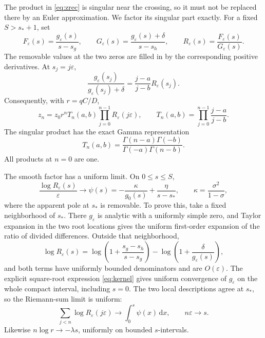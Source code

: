 \documentclass[11pt]{article}
\theoremstyle{definition}
\theoremstyle{remark}
\newcommand{\eps}{\varepsilon}
\newcommand{\dd}{\mathrm d}
\begin{document}
The product in \eqref{eq:zrec} is singular near the crossing, so it must not
be replaced there by an Euler approximation.  We factor its singular part
exactly.  For a fixed \(S>s_*+1\), set
\[
 F_\eps(s)=\frac{g_\eps(s)}{s-s_g},\qquad
 G_\eps(s)=\frac{g_\eps(s)+\delta}{s-s_h},\qquad
 R_\eps(s)=\frac{F_\eps(s)}{G_\eps(s)}.
\]
The removable values at the two zeros are filled in by the corresponding
positive derivatives.  At \(s_j=j\eps\),
\[
 \frac{g_\eps(s_j)}{g_\eps(s_j)+\delta}
 =
 \frac{j-a}{j-b}R_\eps(s_j).
\]
Consequently, with \(r=qC/D\),
\begin{equation}\label{eq:gamma-factor}
 z_n=z_0r^nT_n(a,b)
      \prod_{j=0}^{n-1}R_\eps(j\eps),
\qquad
 T_n(a,b)=\prod_{j=0}^{n-1}\frac{j-a}{j-b}.
\end{equation}
The singular product has the exact Gamma representation
\begin{equation}\label{eq:Tgamma}
  T_n(a,b)=
  \frac{\Gamma(n-a)\Gamma(-b)}
       {\Gamma(-a)\Gamma(n-b)}.
\end{equation}
All products at \(n=0\) are one.

The smooth factor has a uniform limit.  On \(0\leq s\leq S\),
\[
  \frac{\log R_\eps(s)}{\eps}
  \longrightarrow
  \psi(s)=-\frac{\kappa}{g_0(s)}
            +\frac{\eta}{s-s_*},
\qquad
  \kappa=\frac{\sigma^2}{1-\sigma},
\]
where the apparent pole at \(s_*\) is removable.  To prove this, take a
fixed neighborhood of \(s_*\).  There \(g_\eps\) is analytic with a uniformly
simple zero, and Taylor expansion in the two root locations gives the
uniform first-order expansion of the ratio of divided differences.  Outside
that neighborhood,
\[
 \log R_\eps(s)=
 \log\left(1+\frac{s_g-s_h}{s-s_g}\right)
 -\log\left(1+\frac{\delta}{g_\eps(s)}\right),
\]
and both terms have uniformly bounded denominators and are \(O(\eps)\).
The explicit square-root expression \eqref{eq:kernel} gives uniform
convergence of \(g_\eps\) on the whole compact interval, including \(s=0\).
The two local descriptions agree at \(s_*\), so the Riemann-sum limit is
uniform:
\begin{equation}\label{eq:Rsump}
 \sum_{j<n}\log R_\eps(j\eps)
 \longrightarrow \int_0^s\psi(x)\,\dd x,
 \qquad n\eps\longrightarrow s.
\end{equation}
Likewise \(n\log r\to-\lambda s\), uniformly on bounded \(s\)-intervals.
\end{document}
